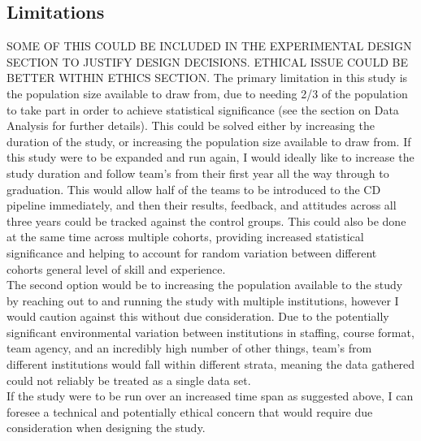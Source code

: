 \documentclass[journal]{IEEEtran}
\begin{document}
\subsection{Limitations}
SOME OF THIS COULD BE INCLUDED IN THE EXPERIMENTAL DESIGN SECTION TO JUSTIFY DESIGN DECISIONS. ETHICAL ISSUE COULD BE BETTER WITHIN ETHICS SECTION. 
The primary limitation in this study is the population size available to draw from, due to needing 2/3 of the population to take part in order to achieve statistical significance (see the section on Data Analysis for further details). This could be solved either by increasing the duration of the study, or increasing the population size available to draw from. If this study were to be expanded and run again, I would ideally like to increase the study duration and follow team's from their first year all the way through to graduation. This would allow half of the teams to be introduced to the CD pipeline immediately, and then their results, feedback, and attitudes across all three years could be tracked against the control groups. This could also be done at the same time across multiple cohorts, providing increased statistical significance and helping to account for random variation between different cohorts general level of skill and experience. \\
The second option would be to  increasing the population available to the study by reaching out to and running the study with multiple institutions, however I would caution against this without due consideration. Due to the potentially significant environmental variation between institutions in staffing, course format, team agency, and an incredibly high number of other things, team's from different institutions would fall within different strata, meaning the data gathered could not reliably be treated as a single data set. \\
If the study were to be run over an increased time span as suggested above, I can foresee a technical and potentially ethical concern that would require due consideration when designing the study.
\end{document}
